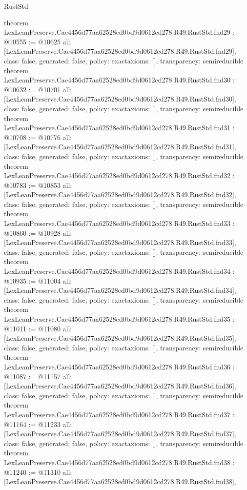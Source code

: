 \begin{lexlean}{RustStd}
\begin{coremodule}
{}
theorem LexLeanPreserve.Cae4456d77aa62528ed0bd9d0612cd278.R49.RustStd.fnd29 : @10555 := @10625 {
  all: [LexLeanPreserve.Cae4456d77aa62528ed0bd9d0612cd278.R49.RustStd.fnd29],
  class: false,
  generated: false,
  policy: exact{axioms: []},
  transparency: semireducible
}
theorem LexLeanPreserve.Cae4456d77aa62528ed0bd9d0612cd278.R49.RustStd.fnd30 : @10632 := @10701 {
  all: [LexLeanPreserve.Cae4456d77aa62528ed0bd9d0612cd278.R49.RustStd.fnd30],
  class: false,
  generated: false,
  policy: exact{axioms: []},
  transparency: semireducible
}
theorem LexLeanPreserve.Cae4456d77aa62528ed0bd9d0612cd278.R49.RustStd.fnd31 : @10708 := @10776 {
  all: [LexLeanPreserve.Cae4456d77aa62528ed0bd9d0612cd278.R49.RustStd.fnd31],
  class: false,
  generated: false,
  policy: exact{axioms: []},
  transparency: semireducible
}
theorem LexLeanPreserve.Cae4456d77aa62528ed0bd9d0612cd278.R49.RustStd.fnd32 : @10783 := @10853 {
  all: [LexLeanPreserve.Cae4456d77aa62528ed0bd9d0612cd278.R49.RustStd.fnd32],
  class: false,
  generated: false,
  policy: exact{axioms: []},
  transparency: semireducible
}
theorem LexLeanPreserve.Cae4456d77aa62528ed0bd9d0612cd278.R49.RustStd.fnd33 : @10860 := @10928 {
  all: [LexLeanPreserve.Cae4456d77aa62528ed0bd9d0612cd278.R49.RustStd.fnd33],
  class: false,
  generated: false,
  policy: exact{axioms: []},
  transparency: semireducible
}
theorem LexLeanPreserve.Cae4456d77aa62528ed0bd9d0612cd278.R49.RustStd.fnd34 : @10935 := @11004 {
  all: [LexLeanPreserve.Cae4456d77aa62528ed0bd9d0612cd278.R49.RustStd.fnd34],
  class: false,
  generated: false,
  policy: exact{axioms: []},
  transparency: semireducible
}
theorem LexLeanPreserve.Cae4456d77aa62528ed0bd9d0612cd278.R49.RustStd.fnd35 : @11011 := @11080 {
  all: [LexLeanPreserve.Cae4456d77aa62528ed0bd9d0612cd278.R49.RustStd.fnd35],
  class: false,
  generated: false,
  policy: exact{axioms: []},
  transparency: semireducible
}
theorem LexLeanPreserve.Cae4456d77aa62528ed0bd9d0612cd278.R49.RustStd.fnd36 : @11087 := @11157 {
  all: [LexLeanPreserve.Cae4456d77aa62528ed0bd9d0612cd278.R49.RustStd.fnd36],
  class: false,
  generated: false,
  policy: exact{axioms: []},
  transparency: semireducible
}
theorem LexLeanPreserve.Cae4456d77aa62528ed0bd9d0612cd278.R49.RustStd.fnd37 : @11164 := @11233 {
  all: [LexLeanPreserve.Cae4456d77aa62528ed0bd9d0612cd278.R49.RustStd.fnd37],
  class: false,
  generated: false,
  policy: exact{axioms: []},
  transparency: semireducible
}
theorem LexLeanPreserve.Cae4456d77aa62528ed0bd9d0612cd278.R49.RustStd.fnd38 : @11240 := @11310 {
  all: [LexLeanPreserve.Cae4456d77aa62528ed0bd9d0612cd278.R49.RustStd.fnd38],
}
\end{coremodule}
\end{lexlean}
